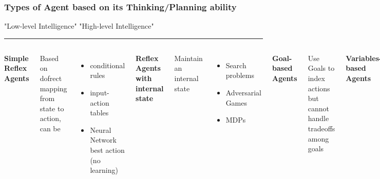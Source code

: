 \documentclass{beamer}
\begin{document}
\begin{frame}
  \frametitle{Types of Agent based on its Thinking/Planning ability}
  "Low-level Intelligence" \hfill "High-level Intelligence"
  \rule{\textwidth}{2pt}
  \vspace{10pt}

  \begin{columns}
    \small
    \textbf{Simple Reflex Agents}

    Based on dofrect mapping from state to action, can be 
    \begin{itemize}
      \item conditional rules
      \item input-action tables
      \item Neural Network best action (no learning)
    \end{itemize}

    \textbf{Reflex Agents with internal state}

    Maintain an internal state
    \begin{itemize}
      \item Search problems
      \item Adversarial Games
      \item MDPs
    \end{itemize}

    \textbf{Goal-based Agents}

    Use Goals to index actions but cannot handle tradeoffs among goals
    \vspace{5pt}

    \textbf{Variables-based Agents}
  
    solve problems with soft or hard constraints or dependencies
    \begin{itemize}
      \item CSP
      \item Bayes Nets
    \end{itemize}

    \textbf{Utility-based agents}

    Compute expected value for an actions, handle tradeoffs and Uncertainty
    \vspace{5pt}

    \textbf{Logic-based agents}
    Use Natural Language, Reason deeply with Information
    
  \end{columns}
\end{frame}
\end{document}
